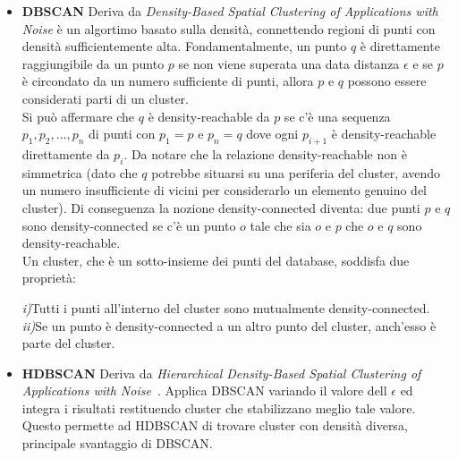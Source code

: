 \begin{itemize}
\item \textbf{DBSCAN}
Deriva da \textit{Density-Based Spatial Clustering of Applications with Noise} è un algortimo basato sulla densità, connettendo regioni di punti con densità sufficientemente alta. Fondamentalmente, un punto $q$  è direttamente raggiungibile da un punto $p$ se non viene superata una data distanza $\epsilon$ e se $p$ è circondato da un numero sufficiente di punti, allora $p$ e $q$ possono essere considerati parti di un cluster. 
\\
Si può affermare che $q$ è density-reachable da $p$ se c'è una sequenza $p_1, p_2,  \ldots, p_n$ di punti con $p_1 = p$ e $p_n = q$ dove ogni $p_{i+1}$ è density-reachable direttamente da $p_i$. Da notare che la relazione density-reachable non è simmetrica (dato che $q$ potrebbe situarsi su una periferia del cluster, avendo un numero insufficiente di vicini per considerarlo un elemento genuino del cluster). Di conseguenza la nozione density-connected diventa: due punti $p$ e $q$ sono density-connected se c'è un punto $o$ tale che sia $o$ e $p$ che $o$ e $q$ sono density-reachable.
\\
Un cluster, che è un sotto-insieme dei punti del database, soddisfa due proprietà:

\textit{i)}Tutti i punti all'interno del cluster sono mutualmente density-connected.
\textit{ii)}Se un punto è density-connected a un altro punto del cluster, anch'esso è parte del cluster.

\item \textbf{HDBSCAN}
Deriva da \textit{Hierarchical Density-Based Spatial Clustering of Applications with Noise}~\cite{Campello15}. Applica DBSCAN variando il valore dell $\epsilon$ ed integra i risultati restituendo cluster che stabilizzano meglio tale valore.
\\
Questo permette ad HDBSCAN di trovare cluster con densità diversa, principale svantaggio di DBSCAN.
\end{itemize}
